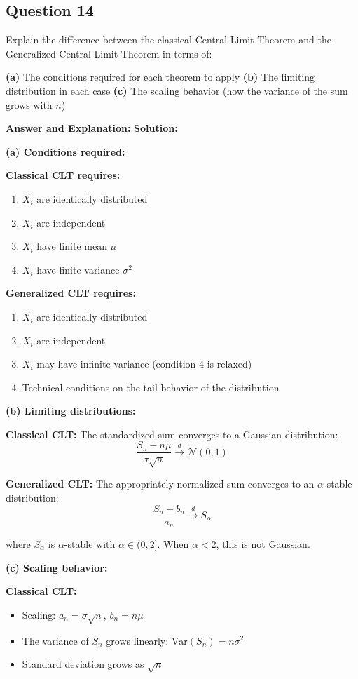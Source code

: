 \documentclass[11pt]{article}
\newenvironment{answer}{\color{answercolor}\begin{framed}\textbf{Answer and Explanation:}}{\end{framed}}
\begin{document}
\subsection{Question 14}
Explain the difference between the classical Central Limit Theorem and the Generalized Central Limit Theorem in terms of:

\textbf{(a)} The conditions required for each theorem to apply
\textbf{(b)} The limiting distribution in each case
\textbf{(c)} The scaling behavior (how the variance of the sum grows with $n$)

\begin{answer}
\textbf{Solution:}

\textbf{(a) Conditions required:}

\textbf{Classical CLT requires:}
\begin{enumerate}
    \item $X_i$ are identically distributed
    \item $X_i$ are independent  
    \item $X_i$ have finite mean $\mu$
    \item $X_i$ have finite variance $\sigma^2$
\end{enumerate}

\textbf{Generalized CLT requires:}
\begin{enumerate}
    \item $X_i$ are identically distributed
    \item $X_i$ are independent
    \item $X_i$ may have infinite variance (condition 4 is relaxed)
    \item Technical conditions on the tail behavior of the distribution
\end{enumerate}

\textbf{(b) Limiting distributions:}

\textbf{Classical CLT:} The standardized sum converges to a Gaussian distribution:
$$\frac{S_n - n\mu}{\sigma\sqrt{n}} \xrightarrow{d} \mathcal{N}(0,1)$$

\textbf{Generalized CLT:} The appropriately normalized sum converges to an $\alpha$-stable distribution:
$$\frac{S_n - b_n}{a_n} \xrightarrow{d} S_\alpha$$

where $S_\alpha$ is $\alpha$-stable with $\alpha \in (0,2]$. When $\alpha < 2$, this is not Gaussian.

\textbf{(c) Scaling behavior:}

\textbf{Classical CLT:} 
\begin{itemize}
    \item Scaling: $a_n = \sigma\sqrt{n}$, $b_n = n\mu$
    \item The variance of $S_n$ grows linearly: $\text{Var}(S_n) = n\sigma^2$
    \item Standard deviation grows as $\sqrt{n}$
\end{itemize}


\end{answer}
\end{document}
